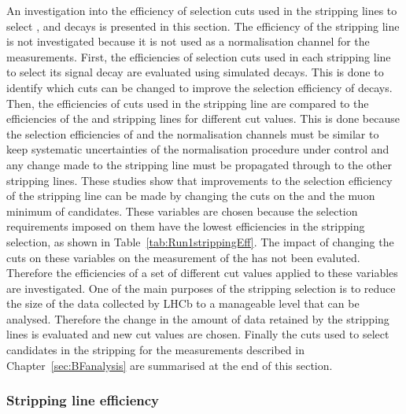 An investigation into the efficiency of selection cuts used in the stripping lines to select \bmumu, \bhh and \bujpsik decays is presented in this section. %
The efficiency of the \bsjpsiphi stripping line is not investigated because it is not used as a normalisation channel for the \BF measurements. 
First, the efficiencies of selection cuts used in each stripping line to select its signal decay are evaluated using simulated decays. This is done to identify which cuts can be changed to improve the selection efficiency of \bmumu decays.
Then, the efficiencies of cuts used in the \bmumu stripping line are compared to the efficiencies of the \bhh and \bujpsik stripping lines for different cut values. %
This is done because the selection efficiencies of \bmumu and the normalisation channels must be similar to keep systematic uncertainties of the normalisation procedure under control and any change made to the \bmumu stripping line must be propagated through to the other stripping lines. 
These studies show that improvements to the selection efficiency of the \bmumu stripping line can be made by changing the cuts on the \bsd \chiFD and the muon minimum \chiIP of \bmumu candidates. These variables are chosen because the selection requirements imposed on them have the lowest efficiencies in the stripping selection, as shown in Table~\ref{tab:Run1strippingEff}. The impact of changing the cuts on these variables on the measurement of the \bmumu \BFs has not been evaluted. Therefore the efficiencies of a set of different cut values applied to these variables are investigated. %
One of the main purposes of the stripping selection is to reduce the size of the data collected by LHCb to a manageable level that can be analysed. Therefore the change in the amount of data retained by the stripping lines is evaluated and new cut values are chosen. Finally the cuts used to select candidates in the stripping for the \BF measurements described in Chapter~\ref{sec:BFanalysis} are summarised at the end of this section.


\subsubsection*{Stripping line efficiency}


